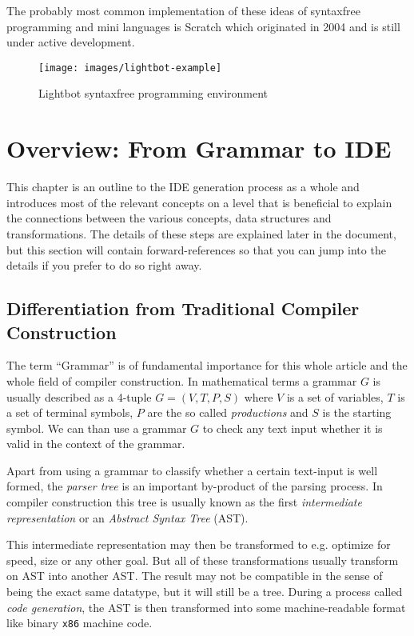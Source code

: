 The probably most common implementation of these ideas of syntaxfree programming and mini languages is Scratch which originated in 2004 \cite{maloney_scratch_2004} and is still under active development.

\begin{figure}
  \texttt{[image: images/lightbot-example]}
  \caption{Lightbot syntaxfree programming environment}
  \label{fig:lightbot}
\end{figure}


\section{Overview: From Grammar to IDE}

This chapter is an outline to the IDE generation process as a whole and introduces most of the relevant concepts on a level that is beneficial to explain the connections between the various concepts, data structures and transformations. The details of these steps are explained later in the document, but this section will contain forward-references so that you can jump into the details if you prefer to do so right away.

\subsection{Differentiation from Traditional Compiler Construction}
\label{sec:diff-traditional-compiler}

The term \enquote{Grammar} is of fundamental importance for this whole article and the whole field of compiler construction. In mathematical terms a grammar $G$ is usually described as a 4-tuple $G = (V, T, P, S)$ where $V$ is a set of variables, $T$ is a set of terminal symbols, $P$ are the so called \textit{productions} and $S$ is the starting symbol\cite[Chapter 5]{hopcroft_formal_languages}. We can than use a grammar $G$ to check any text input whether it is valid in the context of the grammar.

Apart from using a grammar to classify whether a certain text-input is well formed, the \textit{parser tree} is an important by-product of the parsing process. In compiler construction this tree is usually known as the first \textit{intermediate representation} or an \textit{Abstract Syntax Tree} (AST)\cite[Chapter 6]{dragon_book}.

This intermediate representation may then be transformed to e.g. optimize for speed, size or any other goal. But all of these transformations usually transform on AST into another AST. The result may not be compatible in the sense of being the exact same datatype, but it will still be a tree. During a process called \textit{code generation}, the AST is then transformed into some machine-readable format like binary \texttt{x86} machine code\cite[Chapter 8]{dragon_book}.

